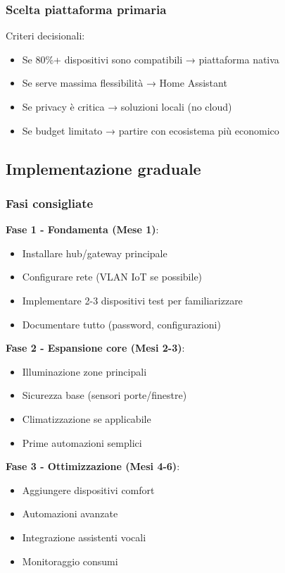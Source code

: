\subsubsection{Scelta piattaforma primaria}

Criteri decisionali:
\begin{itemize}
    \item Se 80\%+ dispositivi sono compatibili → piattaforma nativa
    \item Se serve massima flessibilità → Home Assistant
    \item Se privacy è critica → soluzioni locali (no cloud)
    \item Se budget limitato → partire con ecosistema più economico
\end{itemize}

\subsection{Implementazione graduale}

\subsubsection{Fasi consigliate}

\textbf{Fase 1 - Fondamenta (Mese 1)}:
\begin{itemize}
    \item Installare hub/gateway principale
    \item Configurare rete (VLAN IoT se possibile)
    \item Implementare 2-3 dispositivi test per familiarizzare
    \item Documentare tutto (password, configurazioni)
\end{itemize}

\textbf{Fase 2 - Espansione core (Mesi 2-3)}:
\begin{itemize}
    \item Illuminazione zone principali
    \item Sicurezza base (sensori porte/finestre)
    \item Climatizzazione se applicabile
    \item Prime automazioni semplici
\end{itemize}

\textbf{Fase 3 - Ottimizzazione (Mesi 4-6)}:
\begin{itemize}
    \item Aggiungere dispositivi comfort
    \item Automazioni avanzate
    \item Integrazione assistenti vocali
    \item Monitoraggio consumi
\end{itemize}


